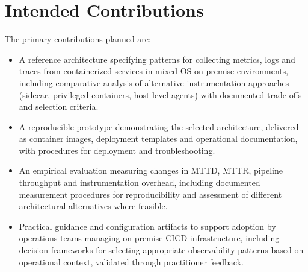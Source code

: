 \section{Intended Contributions}
The primary contributions planned are:
\begin{itemize}
    \item A reference architecture specifying patterns for collecting metrics, logs and traces from containerized services in mixed OS on-premise environments, including comparative analysis of alternative instrumentation approaches (sidecar, privileged containers, host-level agents) with documented trade-offs and selection criteria.
    \item A reproducible prototype demonstrating the selected architecture, delivered as container images, deployment templates and operational documentation, with procedures for deployment and troubleshooting.
    \item An empirical evaluation measuring changes in \ac{MTTD}, \ac{MTTR}, pipeline throughput and instrumentation overhead, including documented measurement procedures for reproducibility and assessment of different architectural alternatives where feasible.
    \item Practical guidance and configuration artifacts to support adoption by operations teams managing on-premise \ac{CICD} infrastructure, including decision frameworks for selecting appropriate observability patterns based on operational context, validated through practitioner feedback.
\end{itemize}

